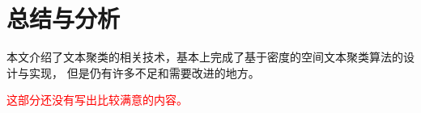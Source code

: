 \section{总结与分析}

本文介绍了文本聚类的相关技术，基本上完成了基于密度的空间文本聚类算法的设计与实现， 但是仍有许多不足和需要改进的地方。

\textcolor{red}{这部分还没有写出比较满意的内容。}